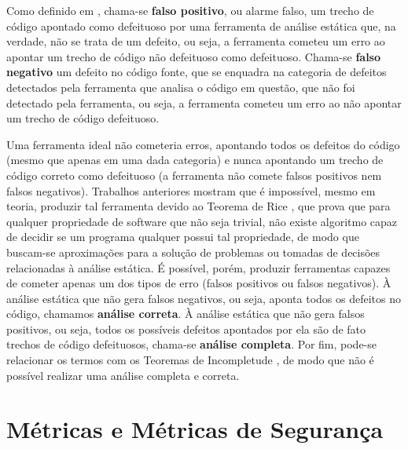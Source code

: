 Como definido em \cite{sa_spec}, chama-se \textbf{falso positivo}, ou alarme falso, um trecho de código apontado como defeituoso por uma ferramenta de análise estática que, na verdade, não se trata de um defeito, ou seja, a ferramenta cometeu um erro ao apontar um trecho de código não defeituoso como defeituoso. Chama-se \textbf{falso negativo} um defeito no código fonte, que se enquadra na categoria de defeitos detectados pela ferramenta que analisa o código em questão, que não foi detectado pela ferramenta, ou seja, a ferramenta cometeu um erro ao não apontar um trecho de código defeituoso.

Uma ferramenta ideal não cometeria erros, apontando todos os defeitos do código (mesmo que apenas em uma dada categoria) e nunca apontando um trecho de código correto como defeituoso (a ferramenta não comete falsos positivos nem falsos negativos). Trabalhos anteriores mostram que é impossível, mesmo em teoria, produzir tal ferramenta \cite{sa_spec} devido ao Teorema de Rice \cite{rice}, que prova que para qualquer propriedade de software que não seja trivial, não existe algoritmo capaz de decidir se um programa qualquer possui tal propriedade, de modo que buscam-se aproximações para a solução de problemas ou tomadas de decisões relacionadas à análise estática. É possível, porém, produzir ferramentas capazes de cometer apenas um dos tipos de erro (falsos positivos ou falsos negativos). À análise estática que não gera falsos negativos, ou seja, aponta todos os defeitos no código, chamamos \textbf{análise correta}. À análise estática que não gera falsos positivos, ou seja, todos os possíveis defeitos apontados por ela são de fato trechos de código defeituosos, chama-se \textbf{análise completa}. Por fim, pode-se relacionar os termos com os Teoremas de Incompletude \cite{godel}, de modo que não é possível realizar uma análise completa e correta.

\section{Métricas e Métricas de Segurança}

